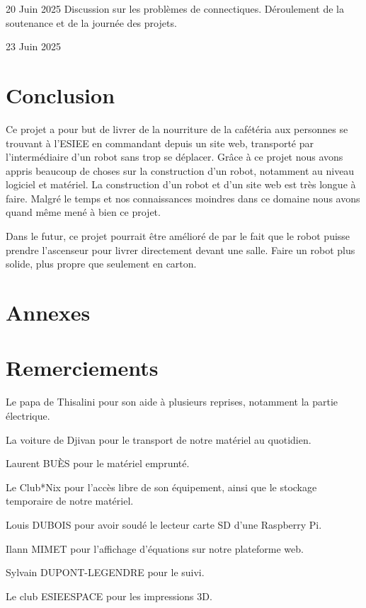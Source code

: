 \documentclass[a4paper,12pt]{report}  %
\begin{document}
20 Juin 2025
Discussion sur les problèmes de connectiques.
Déroulement de la soutenance et de la journée des projets.


23 Juin 2025




\section{Conclusion}

Ce projet a pour but de livrer de la nourriture de la cafétéria aux personnes se trouvant à l’ESIEE en commandant depuis un site web, transporté par l’intermédiaire d’un robot sans trop se déplacer. Grâce à ce projet nous avons appris beaucoup de choses sur la construction d’un robot, notamment au niveau logiciel et matériel. La construction d’un robot et d’un site web est très longue à faire. Malgré le temps et nos connaissances moindres dans ce domaine nous avons quand même mené à bien ce projet.

Dans le futur, ce projet pourrait être amélioré de par le fait que le robot puisse prendre l’ascenseur pour livrer directement devant une salle. Faire un robot plus solide, plus propre que seulement en carton.


\section{Annexes}

\section{Remerciements}
Le papa de Thisalini pour son aide à plusieurs reprises, notamment la partie électrique.

La voiture de Djivan pour le transport de notre matériel au quotidien. 

Laurent BUÈS pour le matériel emprunté. 

Le Club*Nix pour l’accès libre de son équipement, ainsi que le stockage temporaire de notre matériel. 

Louis DUBOIS pour avoir soudé le lecteur carte SD d’une Raspberry Pi. 

Ilann MIMET pour l’affichage d’équations sur notre plateforme web. 

Sylvain DUPONT-LEGENDRE pour le suivi. 

Le club ESIEESPACE pour les impressions 3D.
\end{document}
